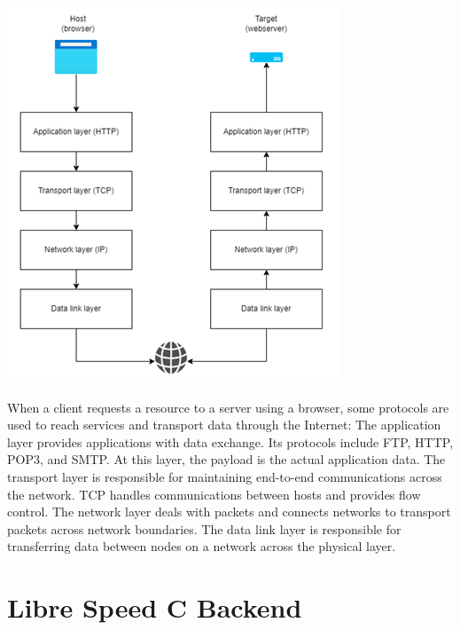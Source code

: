 \documentclass{article}
\begin{document}
\begin{center}
\begin{minipage}{8cm}
\includegraphics[width=\textwidth]{3-http}
\end{minipage}
\end{center}

When a client requests a resource to a server using a browser, some protocols are used to reach services and transport data through the Internet:
The application layer provides applications with data exchange. Its protocols include FTP, HTTP, POP3, and SMTP. At this layer, the payload is the actual application data.
The transport layer is responsible for maintaining end-to-end communications across the network. TCP handles communications between hosts and provides flow control.
The network layer deals with packets and connects networks to transport packets across network boundaries.
The data link layer is responsible for transferring data between nodes on a network across the physical layer.

\newpage
\section{Libre Speed C Backend}
\end{document}
